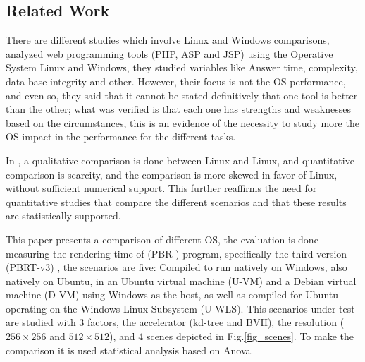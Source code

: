 \documentclass[conference]{IEEEtran}
\begin{document}
\subsection{Related Work}
There are different studies which involve Linux and Windows comparisons,  \cite{duran2006analisis} analyzed web programming tools (PHP, ASP and JSP) using the Operative System Linux and Windows, they studied variables like Answer time, complexity, data base integrity and other. However, their focus is not the OS performance, and even so, they said that it cannot be stated definitively that one tool is better than the other; what was verified is that each one has
strengths and weaknesses based on the circumstances, this is an evidence of the necessity to study more the OS impact in the performance for the different tasks.\par 
In \cite{dhamija2012demographics}, a qualitative comparison is done between Linux and Linux, and quantitative comparison is scarcity, and the comparison is more skewed in favor of Linux, without sufficient numerical support. This further reaffirms the need for quantitative studies that compare the different scenarios and that these results are statistically supported.\par
This paper presents a comparison of different OS, the evaluation is done measuring the rendering time of (PBR \cite{PBR}) program, specifically the third version (PBRT-v3) \cite{PBRT}, the scenarios are five: Compiled to run natively on Windows, also natively on Ubuntu, in an Ubuntu virtual machine (U-VM) and a Debian virtual machine (D-VM) using Windows as the host, as well as compiled for Ubuntu operating on the Windows Linux Subsystem (U-WLS). This scenarios under test are studied with 3 factors, the accelerator (kd-tree and BVH), the resolution ($256 \times 256$ and $512 \times 512$), and 4 scenes depicted in Fig.\ref{fig_scenes}. To make the comparison it is used statistical analysis based on Anova. 
\end{document}
